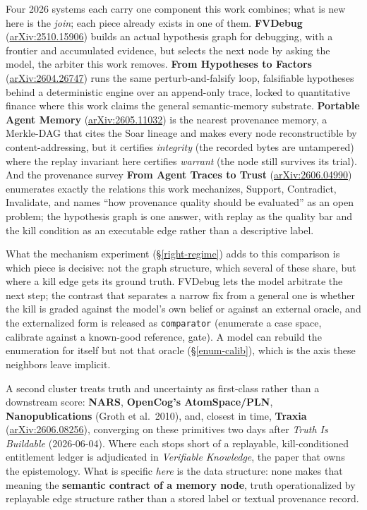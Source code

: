 \documentclass[
  10pt,
]{article}
\newcounter{none} %
\begin{document}
Four 2026 systems each carry one component this work combines; what is
new here is the \emph{join}; each piece already exists in one of them.
\textbf{FVDebug}
(\href{https://arxiv.org/abs/2510.15906}{arXiv:2510.15906}) builds an
actual hypothesis graph for debugging, with a frontier and accumulated
evidence, but selects the next node by asking the model, the arbiter
this work removes. \textbf{From Hypotheses to Factors}
(\href{https://arxiv.org/abs/2604.26747}{arXiv:2604.26747}) runs the
same perturb-and-falsify loop, falsifiable hypotheses behind a
deterministic engine over an append-only trace, locked to quantitative
finance where this work claims the general semantic-memory substrate.
\textbf{Portable Agent Memory}
(\href{https://arxiv.org/abs/2605.11032}{arXiv:2605.11032}) is the
nearest provenance memory, a Merkle-DAG that cites the Soar lineage and
makes every node reconstructible by content-addressing, but it certifies
\emph{integrity} (the recorded bytes are untampered) where the replay
invariant here certifies \emph{warrant} (the node still survives its
trial). And the provenance survey \textbf{From Agent Traces to Trust}
(\href{https://arxiv.org/abs/2606.04990}{arXiv:2606.04990}) enumerates
exactly the relations this work mechanizes, Support, Contradict,
Invalidate, and names ``how provenance quality should be evaluated'' as
an open problem; the hypothesis graph is one answer, with replay as the
quality bar and the kill condition as an executable edge rather than a
descriptive label.

What the mechanism experiment (\S\ref{right-regime}) adds to this
comparison is which piece is decisive: not the graph structure, which
several of these share, but where a kill edge gets its ground truth.
FVDebug lets the model arbitrate the next step; the contrast that
separates a narrow fix from a general one is whether the kill is graded
against the model's own belief or against an external oracle, and the
externalized form is released as \texttt{comparator} (enumerate a case
space, calibrate against a known-good reference, gate). A model can
rebuild the enumeration for itself but not that oracle
(\S\ref{enum-calib}), which is the axis these neighbors leave implicit.

A second cluster treats truth and uncertainty as first-class rather than
a downstream score: \textbf{NARS}, \textbf{OpenCog's AtomSpace/PLN},
\textbf{Nanopublications} (Groth et al.~2010), and, closest in time,
\textbf{Traxia}
(\href{https://arxiv.org/abs/2606.08256}{arXiv:2606.08256}), converging
on these primitives two days after \emph{Truth Is Buildable}
(2026-06-04). Where each stops short of a replayable, kill-conditioned
entitlement ledger is adjudicated in \emph{Verifiable Knowledge}, the
paper that owns the epistemology. What is specific \emph{here} is the
data structure: none makes that meaning the \textbf{semantic contract of
a memory node}, truth operationalized by replayable edge structure
rather than a stored label or textual provenance record.
\end{document}
